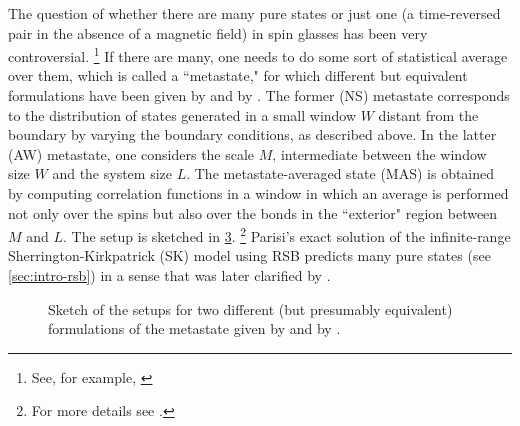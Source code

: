 The question of whether there are many pure states or just one (a time-reversed
pair in the absence of a magnetic field) in spin glasses has been very
controversial.%
\footnote{%
  See, for example,
  \textcite{%
    parisi1980order,%
    parisi1983order,%
    fisher1987absence,%
    fisher1988equilibrium,%
    moore2011disappearance%
  }
}
If there are many, one needs to do some sort of statistical average over them,
which is called a ``metastate," for which different but equivalent formulations
have been given by \textcite{newman1997metastate} and by
\textcite{aizenman1990rounding}. The former (NS) metastate corresponds to the
distribution of states generated in a small window $W$ distant from the
boundary by varying the boundary conditions, as described above. In the latter
(AW) metastate, one considers the scale $M$, intermediate between the window
size $W$ and the system size $L$. The metastate-averaged state (MAS) is
obtained by computing correlation functions in a window in which an average is
performed not only over the spins but also over the bonds in the ``exterior"
region between $M$ and $L$. The setup is sketched in \cref{fig:metastates}.%
\footnote{%
  For more details see
  \textcite{%
    aizenman1990rounding,%
    read2014short,%
    manssen2015aging%
  }.
}
Parisi's exact solution of the infinite-range Sherrington-Kirkpatrick (SK)
model using RSB predicts many pure states (see \cref{sec:intro-rsb}) in a sense
that was later clarified by \textcite{newman1997metastate}.

\begin{figure}
  \centering
  \begin{subfigure}{0.49\textwidth}
    \centering
    
    \label{fig:ns-metastate}
  \end{subfigure}
  \begin{subfigure}{0.49\textwidth}
    \centering
    
    \label{fig:aw-metastate}
  \end{subfigure}
  \caption[
    The spin-glass metastate as defined by \textcite{newman1997metastate} and
    by \textcite{aizenman1990rounding}.
  ]
  {
    Sketch of the setups for two different (but presumably equivalent)
    formulations of the metastate given by 
    \textcite{newman1997metastate} and by 
    \textcite{aizenman1990rounding}.
  } \label{fig:metastates}
\end{figure}

